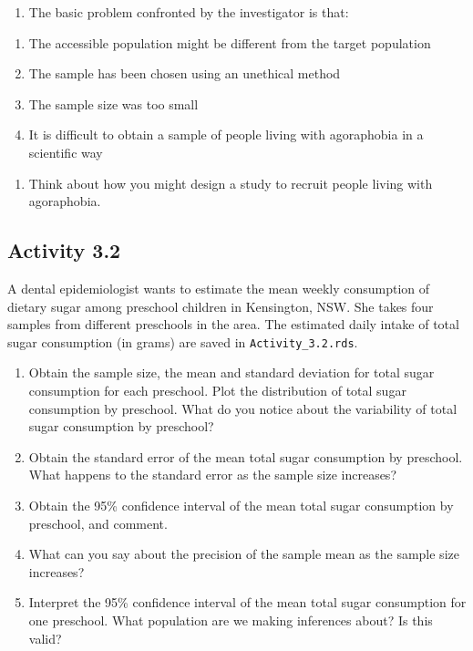 \documentclass[
  a4paper,
]{memoir}
\providecommand{\tightlist}{%
  \setlength{\itemsep}{0pt}\setlength{\parskip}{0pt}}
\begin{document}
\begin{enumerate}
\def\labelenumi{\arabic{enumi}.}
\setcounter{enumi}{1}
\tightlist
\item
  The basic problem confronted by the investigator is that:
\end{enumerate}

\begin{enumerate}
\def\labelenumi{\alph{enumi})}
\tightlist
\item
  The accessible population might be different from the target
  population
\item
  The sample has been chosen using an unethical method
\item
  The sample size was too small
\item
  It is difficult to obtain a sample of people living with agoraphobia
  in a scientific way
\end{enumerate}

\begin{enumerate}
\def\labelenumi{\arabic{enumi}.}
\setcounter{enumi}{2}
\tightlist
\item
  Think about how you might design a study to recruit people living with
  agoraphobia.
\end{enumerate}

\subsection*{Activity 3.2}\label{activity-3.2}

A dental epidemiologist wants to estimate the mean weekly consumption of
dietary sugar among preschool children in Kensington, NSW. She takes
four samples from different preschools in the area. The estimated daily
intake of total sugar consumption (in grams) are saved in
\texttt{Activity\_3.2.rds}.

\begin{enumerate}
\def\labelenumi{\alph{enumi})}
\tightlist
\item
  Obtain the sample size, the mean and standard deviation for total
  sugar consumption for each preschool. Plot the distribution of total
  sugar consumption by preschool. What do you notice about the
  variability of total sugar consumption by preschool?
\item
  Obtain the standard error of the mean total sugar consumption by
  preschool. What happens to the standard error as the sample size
  increases?
\item
  Obtain the 95\% confidence interval of the mean total sugar
  consumption by preschool, and comment.
\item
  What can you say about the precision of the sample mean as the sample
  size increases?
\item
  Interpret the 95\% confidence interval of the mean total sugar
  consumption for one preschool. What population are we making
  inferences about? Is this valid?
\end{enumerate}
\end{document}
